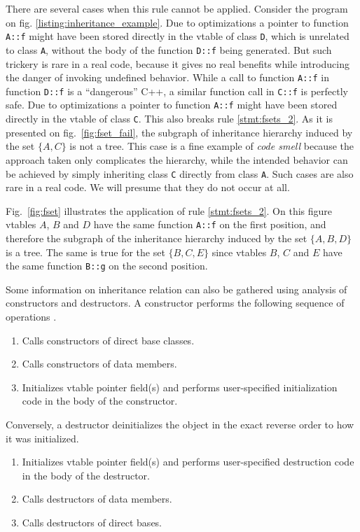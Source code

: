 \documentclass[10pt, conference]{IEEEtran}
\newcommand{\compact}{}
\begin{document}
There are several cases when this rule cannot be applied.
Consider the program on fig. \ref{listing:inheritance_example}.
Due to optimizations a pointer to function \lstinline{A::f} might have been stored
directly in the vtable of class \lstinline{D}, which is unrelated to class \lstinline{A},
without the body of the function \lstinline{D::f} being generated.
But such trickery is rare in a real code, because it gives no real
benefits while introducing the danger of invoking undefined behavior.
While a call to function \lstinline{A::f} in function \lstinline{D::f}
is a ``dangerous'' C++, a similar function call in \lstinline{C::f}
is perfectly safe.
Due to optimizations a pointer to function \lstinline{A::f}
might have been stored directly in the vtable of class \lstinline{C}.
This also breaks rule \ref{stmt:fsets_2}. 
As it is presented on fig.~\ref{fig:fset_fail}, the subgraph of
inheritance hierarchy induced by the set $\{A, C\}$ is not a tree.
This case is a fine example of \textit{code smell} \cite{fowler99} because
the approach taken only complicates the hierarchy, while the intended behavior can
be achieved by simply inheriting class \lstinline{C} directly from class \lstinline{A}.
Such cases are also rare in a real code.
We will presume that they do not occur at all.

Fig.~\ref{fig:fset} illustrates the application of rule \ref{stmt:fsets_2}.
On this figure vtables $A$, $B$ and $D$ have
the same function \lstinline{A::f} on the first position,
and therefore the subgraph of the inheritance hierarchy induced by the set $\{A, B, D\}$ is a tree.
The same is true for the set $\{B, C, E\}$ since vtables $B$, $C$ and $E$ have the same
function \lstinline{B::g} on the second position.

Some information on inheritance relation can also be gathered
using analysis of constructors and destructors.
A constructor performs the following sequence
of operations \cite{cpp03, gray94}.
\begin{enumerate}\compact
\item Calls constructors of direct base classes.
\item Calls constructors of data members.
\item Initializes vtable pointer field(s) and
    performs user-specified initialization code in the body
    of the constructor.
\end{enumerate}

Conversely, a destructor deinitializes the object
in the exact reverse order to how it was initialized.
\begin{enumerate}\compact
\item Initializes vtable pointer field(s) and
    performs user-specified destruction code in the body of the destructor.
\item Calls destructors of data members.
\item Calls destructors of direct bases.
\end{enumerate}
\end{document}
